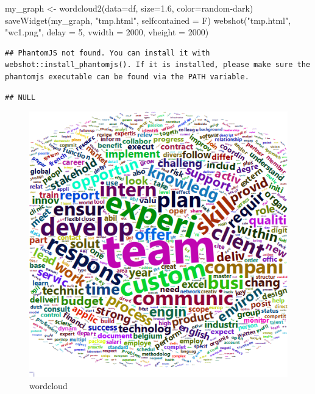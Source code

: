 \documentclass[
]{article}
\newenvironment{Shaded}{\begin{snugshade}}{\end{snugshade}}
\newcommand{\AttributeTok}[1]{\textcolor[rgb]{0.77,0.63,0.00}{#1}}
\newcommand{\DecValTok}[1]{\textcolor[rgb]{0.00,0.00,0.81}{#1}}
\newcommand{\FloatTok}[1]{\textcolor[rgb]{0.00,0.00,0.81}{#1}}
\newcommand{\FunctionTok}[1]{\textcolor[rgb]{0.00,0.00,0.00}{#1}}
\newcommand{\NormalTok}[1]{#1}
\newcommand{\OtherTok}[1]{\textcolor[rgb]{0.56,0.35,0.01}{#1}}
\newcommand{\StringTok}[1]{\textcolor[rgb]{0.31,0.60,0.02}{#1}}
\begin{document}
\begin{Shaded}
\begin{Highlighting}[]
\NormalTok{my\_graph }\OtherTok{\textless{}{-}} \FunctionTok{wordcloud2}\NormalTok{(}\AttributeTok{data=}\NormalTok{df, }\AttributeTok{size=}\FloatTok{1.6}\NormalTok{, }\AttributeTok{color=}\StringTok{\textquotesingle{}random{-}dark\textquotesingle{}}\NormalTok{)}
\FunctionTok{saveWidget}\NormalTok{(my\_graph, }\StringTok{"tmp.html"}\NormalTok{, }\AttributeTok{selfcontained =}\NormalTok{ F)}
\FunctionTok{webshot}\NormalTok{(}\StringTok{"tmp.html"}\NormalTok{, }\StringTok{"wc1.png"}\NormalTok{, }\AttributeTok{delay =} \DecValTok{5}\NormalTok{, }\AttributeTok{vwidth =} \DecValTok{2000}\NormalTok{, }\AttributeTok{vheight =} \DecValTok{2000}\NormalTok{)}
\end{Highlighting}
\end{Shaded}

\begin{verbatim}
## PhantomJS not found. You can install it with webshot::install_phantomjs(). If it is installed, please make sure the phantomjs executable can be found via the PATH variable.
\end{verbatim}

\begin{verbatim}
## NULL
\end{verbatim}

\begin{figure}
\centering
\includegraphics{wc1.png}
\caption{wordcloud}
\end{figure}
\end{document}
